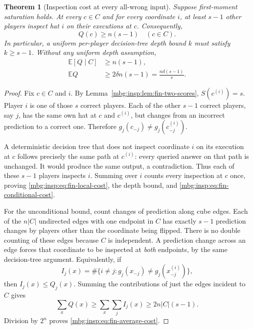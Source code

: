 \documentclass[11pt,letterpaper]{article}
\newtheorem{theorem}{Theorem}[section]
\theoremstyle{definition}
\newcommand{\E}{\mathbb E}
\begin{document}
\begin{theorem}[Inspection cost at every all-wrong input]
\label{mbg:insp:thm:fin-local}
Suppose first-moment saturation holds.  At every $c\in C$ and for every
coordinate $i$, at least $s-1$ other players inspect hat $i$ on their
executions at $c$.  Consequently,
\begin{equation}
 Q(c)\geq n(s-1)\quad(c\in C).
 \label{mbg:insp:eq:fin-local-cost}
\end{equation}
In particular, a uniform per-player decision-tree depth bound $k$ must
satisfy $k\geq s-1$.  Without any uniform depth assumption,
\begin{align}
 \E[Q\mid C]&\geq n(s-1),\label{mbg:insp:eq:fin-conditional-cost}\\
 \E Q&\geq 2\delta n(s-1)
       =\frac{nd(s-1)}{s}.
       \label{mbg:insp:eq:fin-average-cost}
\end{align}
\end{theorem}
\begin{proof}
Fix $c\in C$ and $i$.  By Lemma~\ref{mbg:insp:lem:fin-two-scores},
$S(c^{(i)})=s$.  Player $i$ is one of those $s$ correct players.  Each of
the other $s-1$ correct players, say $j$, has the same own hat at $c$ and
$c^{(i)}$, but changes from an incorrect prediction to a correct one.
Therefore $g_j(c_{-j})\ne g_j(c^{(i)}_{-j})$.

A deterministic decision tree that does not inspect coordinate $i$ on its
execution at $c$ follows precisely the same path at $c^{(i)}$: every
queried answer on that path is unchanged.  It would produce the same
output, a contradiction.  Thus each of these $s-1$ players inspects $i$.
Summing over $i$ counts every inspection at $c$ once, proving
\eqref{mbg:insp:eq:fin-local-cost}, the depth bound, and
\eqref{mbg:insp:eq:fin-conditional-cost}.

For the unconditional bound, count changes of prediction along cube
edges.  Each of the $n|C|$ undirected edges with one endpoint in $C$ has
exactly $s-1$ prediction changes by players other than the coordinate
being flipped.  There is no double counting of these edges because $C$
is independent.  A prediction change across an edge forces that
coordinate to be inspected at \emph{both} endpoints, by the same
decision-tree argument.  Equivalently, if
\[
 I_j(x)=\#\{i\ne j:g_j(x_{-j})\ne g_j(x^{(i)}_{-j})\},
\]
then $I_j(x)\leq Q_j(x)$.  Summing the contributions of just the edges
incident to $C$ gives
\[
 \sum_x Q(x)\geq\sum_x\sum_j I_j(x)
 \geq 2n|C|(s-1).
\]
Division by $2^n$ proves \eqref{mbg:insp:eq:fin-average-cost}.
\end{proof}
\end{document}
